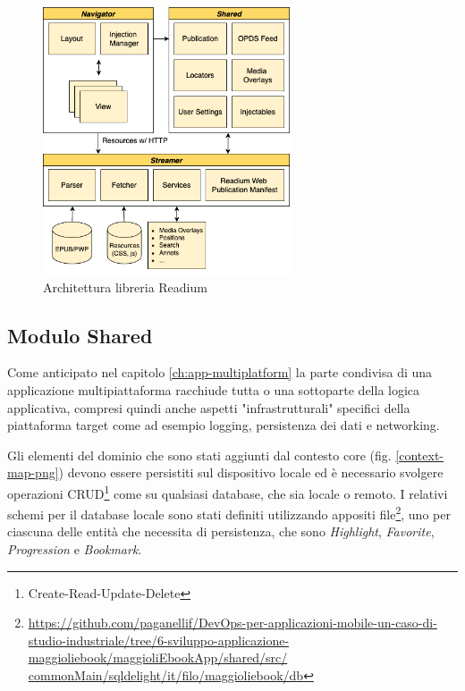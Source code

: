\begin{figure}[H]
    \centering
    \includegraphics[width=0.65\textwidth]{img/readium-arch.png}
    \caption{Architettura libreria Readium}
    \label{readiumarch}
\end{figure}

\subsection{Modulo Shared}
Come anticipato nel capitolo \ref{ch:app-multiplatform} la parte condivisa di una applicazione multipiattaforma racchiude tutta o una sottoparte della logica applicativa, compresi quindi anche aspetti "infrastrutturali" specifici della piattaforma target come ad esempio logging, persistenza dei dati e networking.

Gli elementi del dominio che sono stati aggiunti dal contesto core (fig. \ref{context-map-png}) devono essere persistiti sul dispositivo locale ed è necessario svolgere operazioni CRUD\footnote{Create-Read-Update-Delete} come su qualsiasi database, che sia locale o remoto. I relativi schemi per il database locale sono stati definiti utilizzando appositi file\footnote{\href{https://github.com/paganellif/DevOps-per-applicazioni-mobile-un-caso-di-studio-industriale/tree/6-sviluppo-applicazione-maggioliebook/maggioliEbookApp/shared/src/commonMain/sqldelight/it/filo/maggioliebook/db}{https://github.com/paganellif/DevOps-per-applicazioni-mobile-un-caso-di-studio-industriale/tree/6-sviluppo-applicazione-maggioliebook/maggioliEbookApp/shared/src/\\commonMain/sqldelight/it/filo/maggioliebook/db}}, uno per ciascuna delle entità che necessita di persistenza, che sono \textit{Highlight}, \textit{Favorite}, \textit{Progression} e \textit{Bookmark}.

